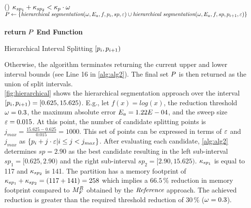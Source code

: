 \begin{algorithm}[t!]
{{			\If(){ $\kappa_{sp_1}+\kappa_{sp_2}  < \kappa_{p}  \cdot \omega$}{
				\vspace{0.2cm}
				$P \leftarrow \{\textit{hierarchical segmentation}(\omega,E_a,f,p_{i},sp,\varepsilon) \cup \textit{hierarchical segmentation}(\omega,E_a,f,sp,p_{i+1},\varepsilon) \}$\\ \tcp*[f]{\footnotesize Recursive call for sub-intervals $[\Partition{i},sp)$ and $[sp,\Partition{i+1})$}\\
				
			}
			{\textbf{return} $ P $ }
		}	
	}
	\textbf{End Function}
	\caption{\small  Hierarchical Interval Splitting $[p_{i}, p_{i+1})$}\label{alg:alg2}
\end{algorithm}
Otherwise, the algorithm terminates returning the current upper and lower interval bounds (see Line 16 in \cref{alg:alg2}). 
The final set $P$ is then returned as the union of split intervals.\\
\cref{fig:hierarchical} shows the hierarchical segmentation approach over the interval $[p_{i},p_{i+1})=[0.625,15.625)$.
E.g., let $f(x)=log(x)$, the reduction threshold $\omega=0.3$, the maximum absolute error $E_a=1.22E-04$, and the sweep size $\varepsilon=0.015$.
At this point, the number of candidate splitting points is $j_{max}=\frac{15.625-0.625}{0.015}=1000$.
This set of points can be expressed in terms of $\varepsilon$ and $j_{max}$ as $\{p_{i}+j\cdot\varepsilon|i\leq j<j_{max}\}$.
After evaluating each candidate, \cref{alg:alg2} determines $sp=2.90$ as the best candidate resulting in the left sub-interval $sp_1=[0.625,2.90)$ and the right sub-interval $sp_2=[2.90,15.625)$. 
$\kappa_{sp_1}$ is equal to 117 and $\kappa_{sp_2}$ is 141.
The partition has a memory footprint of $\kappa_{sp_1}+\kappa_{sp_2}=(117+141)=258$ which implies a $66.5\,\%$ reduction in memory footprint compared to $M_{F}^R$ obtained by the $\textit{Reference}$ approach. 
The achieved reduction is greater than the required threshold reduction of $30\,\%$ ($\omega=0.3$).
